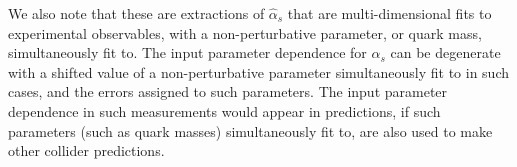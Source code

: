 \documentclass[twocolumn,nofootinbib,amsmath,amssymb,prl,aps,superscriptaddress,tightenlines,preprintnumbers]{revtex4}
\begin{document}
We also note that these are extractions of $\hat{\alpha}_s$ that are multi-dimensional fits
to experimental observables, with a non-perturbative parameter, or quark mass, simultaneously fit to.
The input parameter dependence for $\hat{\alpha}_s$ can be degenerate with a shifted
value of a non-perturbative parameter simultaneously fit to in such cases, and the errors assigned to such parameters.
The input parameter dependence in such measurements would appear in predictions,
if such parameters (such as quark masses) simultaneously fit to, are also used to make other collider predictions.


\end{document}
